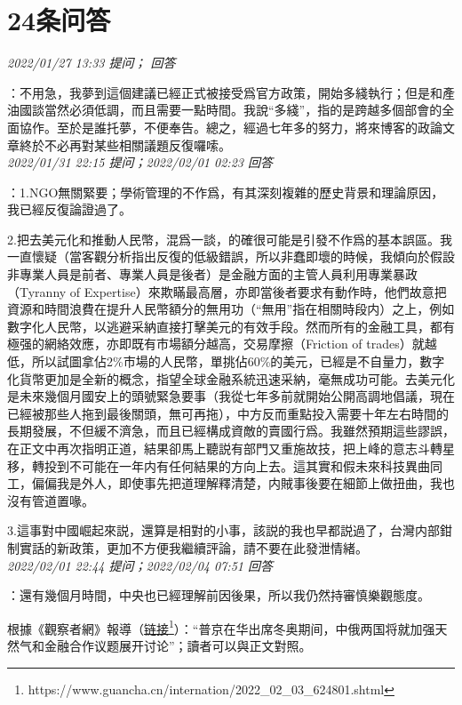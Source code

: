 \documentclass[twocolumn]{ctexart}
\begin{document}
\section{24条问答}

\textit{\hfill\noindent\small 2022/01/27 13:33 提问； 回答}

：不用急，我夢到這個建議已經正式被接受爲官方政策，開始多綫執行；但是和產油國談當然必須低調，而且需要一點時間。我說“多綫”，指的是跨越多個部會的全面協作。至於是誰托夢，不便奉告。總之，經過七年多的努力，將來博客的政論文章終於不必再對某些相關議題反復囉嗦。\\

\textit{\hfill\noindent\small 2022/01/31 22:15 提问；2022/02/01 02:23 回答}

：1.NGO無關緊要；學術管理的不作爲，有其深刻複雜的歷史背景和理論原因，我已經反復論證過了。

2.把去美元化和推動人民幣，混爲一談，的確很可能是引發不作爲的基本誤區。我一直懷疑（當客觀分析指出反復的低級錯誤，所以非蠢即壞的時候，我傾向於假設非專業人員是前者、專業人員是後者）是金融方面的主管人員利用專業暴政（Tyranny of Expertise）來欺瞞最高層，亦即當後者要求有動作時，他們故意把資源和時間浪費在提升人民幣額分的無用功（“無用”指在相關時段内）之上，例如數字化人民幣，以逃避采納直接打擊美元的有效手段。然而所有的金融工具，都有極强的網絡效應，亦即既有市場額分越高，交易摩擦（Friction of trades）就越低，所以試圖拿佔2\%市場的人民幣，單挑佔60\%的美元，已經是不自量力，數字化貨幣更加是全新的概念，指望全球金融系統迅速采納，毫無成功可能。去美元化是未來幾個月國安上的頭號緊急要事（我從七年多前就開始公開高調地倡議，現在已經被那些人拖到最後關頭，無可再拖），中方反而重點投入需要十年左右時間的長期發展，不但緩不濟急，而且已經構成資敵的賣國行爲。我雖然預期這些謬誤，在正文中再次指明正道，結果卻馬上聽説有部門又重施故技，把上峰的意志斗轉星移，轉投到不可能在一年内有任何結果的方向上去。這其實和假未來科技異曲同工，偏偏我是外人，即使事先把道理解釋清楚，内賊事後要在細節上做扭曲，我也沒有管道置喙。

3.這事對中國崛起來説，還算是相對的小事，該説的我也早都説過了，台灣内部鉗制實話的新政策，更加不方便我繼續評論，請不要在此發泄情緒。
\\

\textit{\hfill\noindent\small 2022/02/01 22:44 提问；2022/02/04 07:51 回答}

：還有幾個月時間，中央也已經理解前因後果，所以我仍然持審慎樂觀態度。


根據《觀察者網》報導（\href{https://www.guancha.cn/internation/2022\_02\_03\_624801.shtml}{链接\footnote{\url{https://www.guancha.cn/internation/2022\_02\_03\_624801.shtml}}}）：“普京在华出席冬奥期间，中俄两国将就加强天然气和金融合作议题展开讨论”；讀者可以與正文對照。
\\
\end{document}
